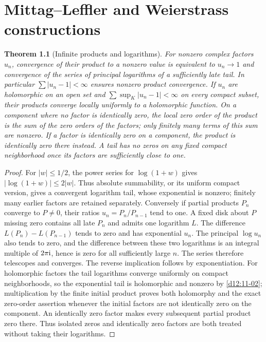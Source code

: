 \documentclass[11pt,a4paper,openany]{book}
\newtheorem{theorem}{Theorem}[chapter]
\theoremstyle{definition}
\theoremstyle{remark}\newtheorem{remark}[theorem]{Remark}
\newcommand{\family}[1]{}
\begin{document}

\chapter{Mittag--Leffler and Weierstrass constructions}\label{ch:d12-16}

\begin{theorem}[Infinite products and logarithms]\family{D12.16.01}\label{d12:16-01}
For nonzero complex factors $u_n$, convergence of their product to a nonzero value is equivalent to $u_n\to1$ and convergence of the series of principal logarithms of a sufficiently late tail. In particular $\sum|u_n-1|<\infty$ ensures nonzero product convergence. If $u_n$ are holomorphic on an open set and $\sum\sup_K|u_n-1|<\infty$ on every compact subset, their products converge locally uniformly to a holomorphic function. On a component where no factor is identically zero, the local zero order of the product is the sum of the zero orders of the factors; only finitely many terms of this sum are nonzero. If a factor is identically zero on a component, the product is identically zero there instead. A tail has no zeros on any fixed compact neighborhood once its factors are sufficiently close to one.
\end{theorem}
\begin{proof}
For $|w|\le1/2$, the power series for $\log(1+w)$ gives $|\log(1+w)|\le2|w|$. Thus absolute summability, or its uniform compact version, gives a convergent logarithm tail, whose exponential is nonzero; finitely many earlier factors are retained separately. Conversely if partial products $P_n$ converge to $P\ne0$, their ratios $u_n=P_n/P_{n-1}$ tend to one. A fixed disk about $P$ missing zero contains all late $P_n$ and admits one logarithm $L$. The difference $L(P_n)-L(P_{n-1})$ tends to zero and has exponential $u_n$. The principal $\log u_n$ also tends to zero, and the difference between these two logarithms is an integral multiple of $2\pi\mathrm i$, hence is zero for all sufficiently large $n$. The series therefore telescopes and converges. The reverse implication follows by exponentiation. For holomorphic factors the tail logarithms converge uniformly on compact neighborhoods, so the exponential tail is holomorphic and nonzero by \cref{d12:11-02}; multiplication by the finite initial product proves both holomorphy and the exact zero-order assertion whenever the initial factors are not identically zero on the component. An identically zero factor makes every subsequent partial product zero there. Thus isolated zeros and identically zero factors are both treated without taking their logarithms.
\end{proof}
\end{document}
